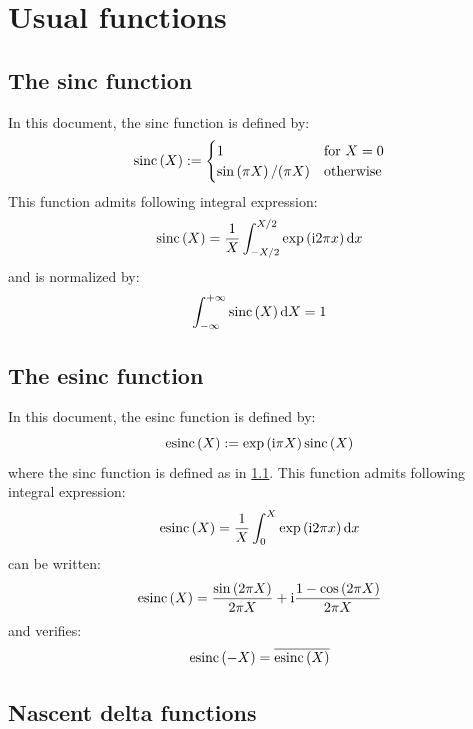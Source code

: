 \documentclass[10pt,a4paper,twoside,openany]{book}
\begin{document}
\chapter{Usual functions}

\section{The sinc function}
\label{sinc}

In this document, the sinc function is defined by:
\begin{equation*}
\mathrm{sinc} \left( {X} \right) := \begin{cases}
1 & \text{for $X = 0$} \\
\mathrm{sin} \left( {\pi X} \right) / ( \pi X ) & \text{otherwise}
\end{cases}
\end{equation*}
This function admits following integral expression:
\begin{equation*}
\mathrm{sinc} \left( {X} \right) = \frac 1 X \int_{-X/2}^{X/2} \mathrm{exp} \left( {\mathrm{i} 2 \pi x} \right) \mathrm dx
\end{equation*}
and is normalized by:
\begin{equation*}
\int_{-\infty}^{+\infty} \mathrm{sinc} \left( {X} \right) \mathrm dX = 1
\end{equation*}

\section{The esinc function}
\label{esinc}

In this document, the esinc function is defined by:
\begin{equation*}
\mathrm{esinc} \left( {X} \right) := \mathrm{exp} \left( {\mathrm{i} \pi X} \right) \mathrm{sinc} \left( {X} \right)
\end{equation*}
where the sinc function is defined as in \ref{sinc}. This function admits following integral expression:
\begin{equation*}
\mathrm{esinc} \left( {X} \right) = \frac 1 X \int_0^X \mathrm{exp} \left( {\mathrm{i} 2 \pi x} \right) \mathrm dx
\end{equation*}
can be written:
\begin{equation*}
\mathrm{esinc} \left( {X} \right) = \frac{\mathrm{sin} \left( {2 \pi X} \right)}{2 \pi X} + \mathrm{i} \frac{1 - \mathrm{cos} \left( {2 \pi X} \right)}{2 \pi X}
\end{equation*}
and verifies:
\begin{equation*}
\mathrm{esinc} \left( {-X} \right) = \overline{\mathrm{esinc} \left( {X} \right)}
\end{equation*}

\section{Nascent delta functions}
\label{delta}
\end{document}
